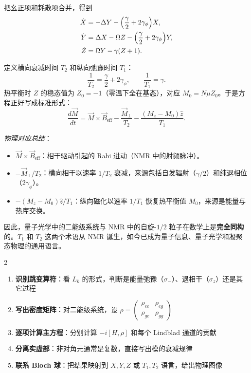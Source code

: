 把幺正项和耗散项合并，得到
\begin{align*}
\dot{X} &= -\Delta Y - \Bigl(\frac{\gamma}{2}+2\gamma_\phi\Bigr)X, \\
\dot{Y} &= \Delta X - \Omega Z - \Bigl(\frac{\gamma}{2}+2\gamma_\phi\Bigr)Y, \\
\dot{Z} &= \Omega Y - \gamma(Z+1).
\end{align*}

定义横向衰减时间 $T_2$ 和纵向弛豫时间 $T_1$：
\[
\frac{1}{T_2} = \frac{\gamma}{2} + 2\gamma_\phi, \qquad
\frac{1}{T_1} = \gamma.
\]
热平衡时 $Z$ 的稳态值为 $Z_0 = -1$（零温下全在基态），对应 $M_0 = N\mu Z_0$。于是方程正好写成标准形式：
\[
\boxed{\frac{d\vec{M}}{dt} = \vec{M}\times\vec{B}_{\text{eff}} - \frac{\vec{M}_\perp}{T_2} - \frac{(M_z-M_0)\hat{z}}{T_1}}.
\]

\textit{物理对应总结}：
\begin{itemize}[nosep]
    \item $\vec{M}\times\vec{B}_{\text{eff}}$：相干驱动引起的 Rabi 进动（NMR 中的射频脉冲）。
    \item $-\vec{M}_\perp/T_2$：横向相干以速率 $1/T_2$ 衰减，来源包括自发辐射（$\gamma/2$）和纯退相位（$2\gamma_\phi$）。
    \item $-(M_z-M_0)\hat{z}/T_1$：纵向磁化以速率 $1/T_1$ 恢复热平衡值 $M_0$，来源是能量与热库交换。
\end{itemize}

因此，量子光学中的二能级系统与 NMR 中的自旋-$1/2$ 粒子在数学上是\textbf{完全同构}的。$T_1$ 和 $T_2$ 这两个术语从 NMR 诞生，如今已成为量子信息、量子光学和凝聚态物理的通用语言。

\begin{multicols}{2}
\begin{thinkbox}
\begin{enumerate}
    \item \textbf{识别跳变算符}：看 $L_k$ 的形式，判断是能量弛豫（$\sigma_-$）、退相干（$\sigma_z$）还是其它过程
    \item \textbf{写出密度矩阵}：对二能级系统，设 $\rho = \begin{pmatrix} \rho_{ee} & \rho_{eg} \\ \rho_{ge} & \rho_{gg} \end{pmatrix}$
    \item \textbf{逐项计算主方程}：分别计算 $-i[H,\rho]$ 和每个 Lindblad 通道的贡献
    \item \textbf{分离实虚部}：非对角元通常是复数，直接写出模的衰减规律
    \item \textbf{联系 Bloch 球}：把结果映射到 $X,Y,Z$ 或 $T_1,T_2$ 语言，给出物理图像
\end{enumerate}
\end{thinkbox}
\end{multicols}

